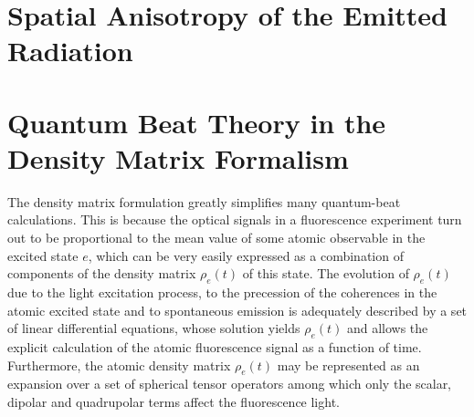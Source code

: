 \documentclass[11pt]{article}
\begin{document}
\section{Spatial Anisotropy of the Emitted Radiation}


























\appendix

\section{Quantum Beat Theory in the Density Matrix Formalism \cite{haroche}}\label{app:quantum_beats}



The density matrix formulation greatly simplifies many quantum-beat calculations. This is because the optical signals in a fluorescence experiment turn out to be proportional to the mean value of some atomic observable in the excited state $e$, which can be very easily expressed as a combination of components of the density matrix $\rho_e(t)$ of this state. The evolution of $\rho_e(t)$ due to the light excitation process, to the precession of the coherences
in the atomic excited state and to spontaneous emission is adequately described by a set of linear differential equations, whose solution yields $\rho_e(t)$ and allows the explicit calculation of the atomic fluorescence signal as a function of time. Furthermore, the atomic density matrix $\rho_e(t)$ may be represented as an expansion over a set of spherical tensor operators
among which only the scalar, dipolar and quadrupolar terms affect the fluorescence light.  
\end{document}
